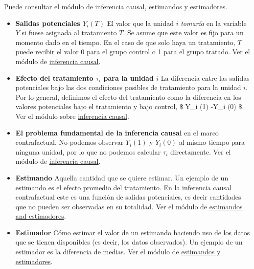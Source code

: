 \documentclass[
  12pt,
  spanish,
]{book}
\begin{document}
Puede consultar el módulo de \href{inferencia-causal.html}{inferencia causal}, \href{estimandos-y-estimadores.html}{estimandos y estimadores}.

\begin{itemize}
\item
  \textbf{Salidas potenciales \(Y_i(T)\)} El valor que la unidad \(i\) \emph{tomaría} en la variable \(Y\) si fuese asignada al tratamiento \(T\). Se asume que este valor es fijo para un momento dado en el tiempo. En el caso de que solo haya un tratamiento, \(T\) puede recibir el valor 0 para el grupo control o 1 para el grupo tratado. Ver el módulo de \href{inferencia-causal.html}{inferencia causal}.
\item
  \textbf{Efecto del tratamiento \(\tau_i\) para la unidad \(i\)} La diferencia entre las salidas potenciales bajo las dos condiciones posibles de tratamiento para la unidad \(i\). Por lo general, definimos el efecto del tratamiento como la diferencia en los valores potenciales bajo el tratamiento y bajo control, \$ Y\_i (1) -Y\_i (0) \$. Ver el módulo sobre \href{inferencia-causal.html}{inferencia causal}.
\item
  \textbf{El problema fundamental de la inferencia causal} en el marco contrafactual. No podemos observar \(Y_i(1)\) y \(Y_i(0)\) al mismo tiempo para ninguna unidad, por lo que no podemos calcular \(\tau_i\) directamente. Ver el módulo de \href{inference-causal.html}{inferencia causal}.
\item
  \textbf{Estimando} Aquella cantidad que se quiere estimar. Un ejemplo de un estimando es el efecto promedio del tratamiento. En la inferencia causal contrafactual este es una función de salidas potenciales, es decir cantidades que no pueden ser observadas en su totalidad. Ver el módulo de \href{estimandos-y-estimadores.html}{estimandos and estimadores}.
\item
  \textbf{Estimador} Cómo estimar el valor de un estimando haciendo uso de los datos que se tienen disponibles (es decir, los datos observados). Un ejemplo de un estimador es la diferencia de medias. Ver el módulo de \href{estimandos-y-estimadores.html}{estimandos y estimadores}.


\end{itemize}
\end{document}
